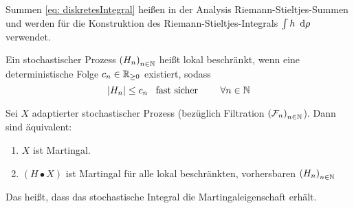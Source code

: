 \begin{*bemerkung}
	Summen \eqref{eq: diskretesIntegral} heißen in der Analysis Riemann-Stieltjes-Summen und werden für die Konstruktion des Riemann-Stieltjes-Integrals $\int h \enskip \mathrm{d}\rho$ verwendet.
\end{*bemerkung}

\begin{*definition}
	Ein stochastischer Prozess $\left( H_n \right)_{n \in \mathbb{N}}$ heißt lokal beschränkt, wenn eine deterministische Folge $c_n \in \mathbb{R}_{\ge 0}$ existiert, sodass
	\begin{equation*}
		\left| H_n \right| \le c_n \enskip \text{ fast sicher } \qquad \forall n \in \mathbb{N}
	\end{equation*}
\end{*definition}

\begin{satz} %
	Sei $X$ adaptierter stochastischer Prozess (bezüglich Filtration $\left( \mathcal{F}_n \right)_{n \in \mathbb{N}}$). Dann sind äquivalent:
	\begin{enumerate}
		\item $X$ ist Martingal.
		\item $(H \bullet X)$ ist Martingal für alle lokal beschränkten, vorhersbaren $\left( H_n \right)_{n \in \mathbb{N}}$
	\end{enumerate}
\end{satz}

Das heißt, dass das stochastische Integral die Martingaleigenschaft erhält.